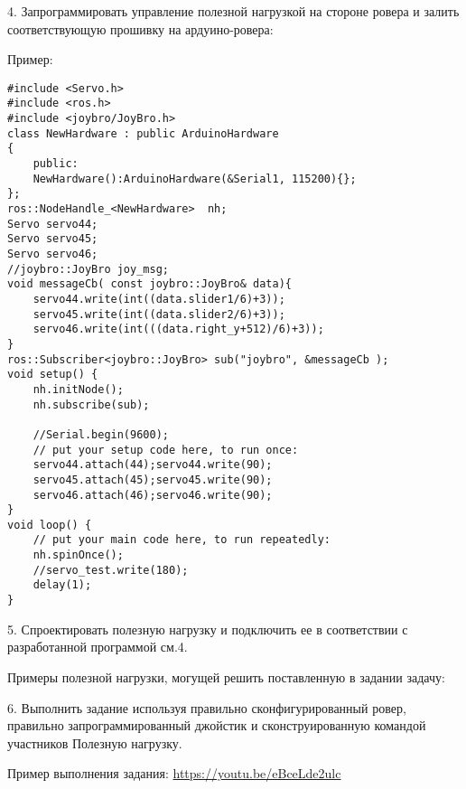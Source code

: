 4. Запрограммировать управление полезной нагрузкой на стороне ровера и залить соответствующую прошивку на ардуино-ровера:

Пример:

\begin{verbatim}
#include <Servo.h>
#include <ros.h>
#include <joybro/JoyBro.h>
class NewHardware : public ArduinoHardware
{
    public:
    NewHardware():ArduinoHardware(&Serial1, 115200){};
};
ros::NodeHandle_<NewHardware>  nh;
Servo servo44;
Servo servo45;
Servo servo46;
//joybro::JoyBro joy_msg;
void messageCb( const joybro::JoyBro& data){
    servo44.write(int((data.slider1/6)+3));
    servo45.write(int((data.slider2/6)+3));
    servo46.write(int(((data.right_y+512)/6)+3));
}
ros::Subscriber<joybro::JoyBro> sub("joybro", &messageCb );
void setup() {
    nh.initNode();
    nh.subscribe(sub);
    
    //Serial.begin(9600);
    // put your setup code here, to run once:
    servo44.attach(44);servo44.write(90);
    servo45.attach(45);servo45.write(90);
    servo46.attach(46);servo46.write(90);
}
void loop() {
    // put your main code here, to run repeatedly:
    nh.spinOnce();
    //servo_test.write(180);
    delay(1);
}
\end{verbatim}

5. Спроектировать полезную нагрузку и подключить ее в соответствии с разработанной программой см.4. 

Примеры полезной нагрузки, могущей решить поставленную в задании задачу:




6. Выполнить задание используя правильно сконфигурированный ровер, правильно запрограммированный джойстик и сконструированную командой участников Полезную нагрузку.

Пример выполнения задания: \url{https://youtu.be/eBceLde2ulc}